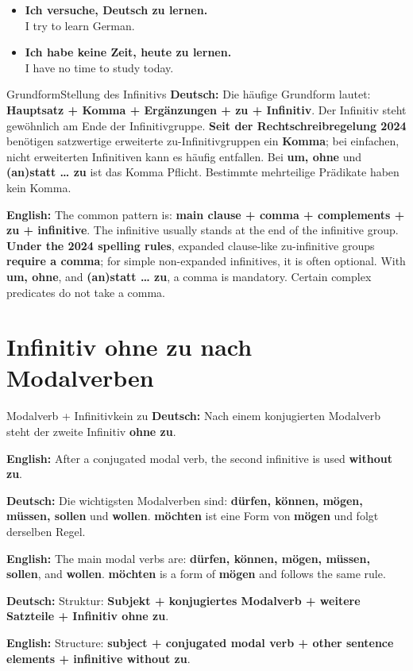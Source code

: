 \documentclass[a4paper,11pt]{article}
\newcommand{\GermanText}[1]{\textbf{Deutsch: }#1\par}
\newcommand{\EnglishText}[1]{{\small\color{SoftGray}\textbf{English: }#1\par}}
\newcommand{\ExampleItem}[2]{\item \textbf{#1}\\{\small\color{SoftGray}#2}}
\begin{document}
        \begin{exbox}
            \begin{itemize}
                \ExampleItem{Ich versuche, Deutsch zu lernen.}{I try to learn German.}
                \ExampleItem{Ich habe keine Zeit, heute zu lernen.}{I have no time to study today.}
            \end{itemize}
        \end{exbox}

        \begin{grammarentry}{Grundform}{Stellung des Infinitivs}
            \GermanText{Die häufige Grundform lautet: \textbf{Hauptsatz + Komma + Ergänzungen + zu + Infinitiv}. Der Infinitiv steht gewöhnlich am Ende der Infinitivgruppe. \textbf{Seit der Rechtschreibregelung 2024} benötigen satzwertige erweiterte zu-Infinitivgruppen ein \textbf{Komma}; bei einfachen, nicht erweiterten Infinitiven kann es häufig entfallen. Bei \textbf{um, ohne} und \textbf{(an)statt \ldots{} zu} ist das Komma Pflicht. Bestimmte mehrteilige Prädikate haben kein Komma.}
            \EnglishText{The common pattern is: \textbf{main clause + comma + complements + zu + infinitive}. The infinitive usually stands at the end of the infinitive group. \textbf{Under the 2024 spelling rules}, expanded clause-like zu-infinitive groups \textbf{require a comma}; for simple non-expanded infinitives, it is often optional. With \textbf{um, ohne}, and \textbf{(an)statt \ldots{} zu}, a comma is mandatory. Certain complex predicates do not take a comma.}
        \end{grammarentry}


    \section{Infinitiv ohne \glqq zu\grqq{} nach Modalverben}

        \begin{grammarentry}{Modalverb + Infinitiv}{kein zu}
            \GermanText{Nach einem konjugierten Modalverb steht der zweite Infinitiv \textbf{ohne zu}.}
            \EnglishText{After a conjugated modal verb, the second infinitive is used \textbf{without zu}.}

            \GermanText{Die wichtigsten Modalverben sind: \textbf{dürfen, können, mögen, müssen, sollen} und \textbf{wollen}. \textbf{möchten} ist eine Form von \textbf{mögen} und folgt derselben Regel.}
            \EnglishText{The main modal verbs are: \textbf{dürfen, können, mögen, müssen, sollen}, and \textbf{wollen}. \textbf{möchten} is a form of \textbf{mögen} and follows the same rule.}

            \GermanText{Struktur: \textbf{Subjekt + konjugiertes Modalverb + weitere Satzteile + Infinitiv ohne zu}.}
            \EnglishText{Structure: \textbf{subject + conjugated modal verb + other sentence elements + infinitive without zu}.}
        \end{grammarentry}
\end{document}
